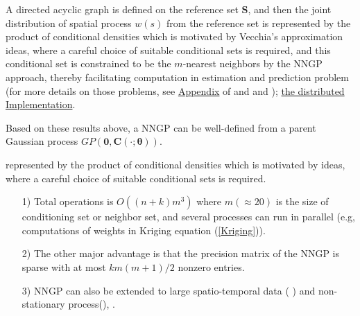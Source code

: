 \documentclass[
12pt, %
a4paper, %
oneside, %
headinclude,footinclude, %
BCOR5mm, %
]{scrartcl}
\begin{document}
A directed acyclic graph is defined on the reference set $\boldsymbol{S}$, and then the joint distribution of spatial process $w(s)$ from the reference set is represented by the product of conditional densities which is motivated by Vecchia’s approximation \citep{vecchia1988estimation} ideas, where a careful choice of suitable conditional sets is required, and this conditional set is constrained to be the $m$-nearest neighbors by the NNGP approach, thereby facilitating computation in estimation and prediction problem (for more details on those problems, see  \href{https://chenyw68.github.io/Literature/[2016]Hierarchical nearest-neighbor Gaussian process models for large geostatistical datasets-Appdix.pdf}{Appendix} of \href{https://chenyw68.github.io/Literature/[2016]Hierarchical nearest-neighbor Gaussian process models for large geostatistical datasets.pdf}{\cite{datta2016hierarchical}} and \href{https://chenyw68.github.io/Literature/[2017]Applying Nearest Neighbor Gaussian Processes to Massive Spatial Data Sets.pdf}{\citep{finley2017applying}} and \href{https://chenyw68.github.io/Literature/[2019]Efficient algorithms for bayesian nearest neighbor gaussian processes.pdf}{\cite{finley2019efficient}}); \href{https://chenyw68.github.io/Literature/[2019]Distributed Implementation of Nearest-Neighbor Gaussian process.pdf}{the distributed Implementation}.

Based on these results above, a NNGP can be well-defined from a parent Gaussian process $GP(\boldsymbol{0}, \boldsymbol{C\left(\cdot; \boldsymbol{\theta}\right)})$.

represented by the product of conditional densities which is motivated by \citet{vecchia1988estimation} ideas, where a careful choice of suitable conditional sets is required.

\begin{itemize}
 \item [1)] Total operations is $O((n + k)m^3)$ where $m (\approx 20)$ is the size of conditioning set or neighbor set, and several processes can run in parallel (e.g, computations of weights in Kriging equation (\ref{Kriging})).
 \item [2)] The other major advantage is that the precision matrix of the NNGP is sparse with at most $km(m + 1)/2$ nonzero entries.
 \item [3)] NNGP can also be extended to large spatio-temporal data (
\href{https://chenyw68.github.io/Literature/[2016]Nonseparable dynamic NNGP models for large spatio-temporal data.pdf}{\cite{datta2016nonseparable}}) and non-stationary process(\href{https://chenyw68.github.io/Literature/[2020]Computationally efficient nonstationary NNGP models using data-driven techniques.pdf}{\cite{konomi2019computationally}}), \href{https://chenyw68.github.io/Literature/[2020-formal]Bayesian inference for high dimensional nonstationary Gaussian processes.pdf}{\citep{risser2020bayesian}}.
\end{itemize}
\end{document}
